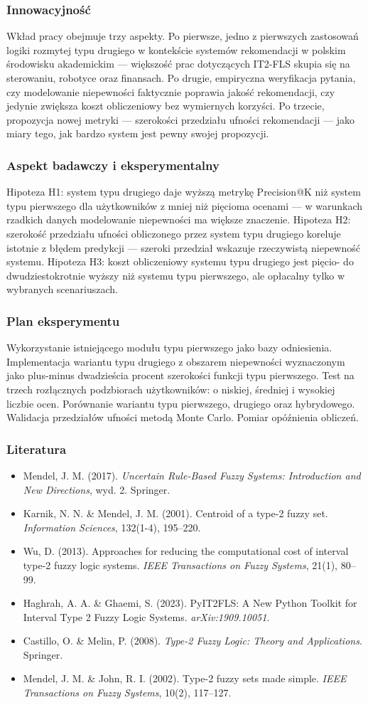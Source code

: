 \documentclass[12pt,a4paper]{article}
\newcommand{\topicsection}[1]{\subsubsection*{#1}}
\newenvironment{literatura}{%
    \topicsection{Literatura}
    \begin{itemize}[leftmargin=1.6em,labelsep=0.5em]
}{%
    \end{itemize}
}
\begin{document}
\topicsection{Innowacyjność}
Wkład pracy obejmuje trzy aspekty. Po pierwsze, jedno z pierwszych zastosowań logiki rozmytej typu drugiego w kontekście systemów rekomendacji w polskim środowisku akademickim --- większość prac dotyczących IT2-FLS skupia się na sterowaniu, robotyce oraz finansach. Po drugie, empiryczna weryfikacja pytania, czy modelowanie niepewności faktycznie poprawia jakość rekomendacji, czy jedynie zwiększa koszt obliczeniowy bez wymiernych korzyści. Po trzecie, propozycja nowej metryki --- szerokości przedziału ufności rekomendacji --- jako miary tego, jak bardzo system jest pewny swojej propozycji.

\topicsection{Aspekt badawczy i eksperymentalny}
Hipoteza H1: system typu drugiego daje wyższą metrykę Precision@K niż system typu pierwszego dla użytkowników z mniej niż pięcioma ocenami --- w warunkach rzadkich danych modelowanie niepewności ma większe znaczenie. Hipoteza H2: szerokość przedziału ufności obliczonego przez system typu drugiego koreluje istotnie z błędem predykcji --- szeroki przedział wskazuje rzeczywistą niepewność systemu. Hipoteza H3: koszt obliczeniowy systemu typu drugiego jest pięcio- do dwudziestokrotnie wyższy niż systemu typu pierwszego, ale opłacalny tylko w wybranych scenariuszach.

\topicsection{Plan eksperymentu}
Wykorzystanie istniejącego modułu typu pierwszego jako bazy odniesienia. Implementacja wariantu typu drugiego z obszarem niepewności wyznaczonym jako plus-minus dwadzieścia procent szerokości funkcji typu pierwszego. Test na trzech rozłącznych podzbiorach użytkowników: o niskiej, średniej i wysokiej liczbie ocen. Porównanie wariantu typu pierwszego, drugiego oraz hybrydowego. Walidacja przedziałów ufności metodą Monte Carlo. Pomiar opóźnienia obliczeń.

\begin{literatura}
\item Mendel, J. M. (2017). \textit{Uncertain Rule-Based Fuzzy Systems: Introduction and New Directions}, wyd. 2. Springer.
\item Karnik, N. N. \& Mendel, J. M. (2001). Centroid of a type-2 fuzzy set. \textit{Information Sciences}, 132(1-4), 195--220.
\item Wu, D. (2013). Approaches for reducing the computational cost of interval type-2 fuzzy logic systems. \textit{IEEE Transactions on Fuzzy Systems}, 21(1), 80--99.
\item Haghrah, A. A. \& Ghaemi, S. (2023). PyIT2FLS: A New Python Toolkit for Interval Type 2 Fuzzy Logic Systems. \textit{arXiv:1909.10051}.
\item Castillo, O. \& Melin, P. (2008). \textit{Type-2 Fuzzy Logic: Theory and Applications}. Springer.
\item Mendel, J. M. \& John, R. I. (2002). Type-2 fuzzy sets made simple. \textit{IEEE Transactions on Fuzzy Systems}, 10(2), 117--127.
\end{literatura}
\end{document}
